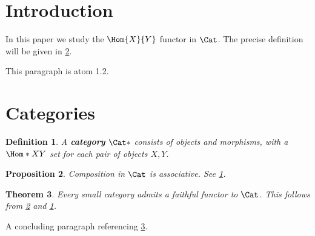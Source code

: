 \documentclass{article}
\newtheorem{theorem}{Theorem}[section]
\newtheorem{definition}[theorem]{Definition}
\newtheorem{proposition}[theorem]{Proposition}
\begin{document}
\section{Introduction}

In this paper we study the $\Hom{X}{Y}$ functor in $\Cat$.
The precise definition will be given in \cref{sec:cats}.

This paragraph is atom 1.2.

\section{Categories}\label{sec:cats}

\begin{definition}\label{def:cat}
  A \textbf{category} $\Cat*$ consists of objects and morphisms,
  with a $\Hom*{X}{Y}$ set for each pair of objects $X, Y$.
\end{definition}

\begin{proposition}\label{prop:comp}
  Composition in $\Cat$ is associative. See \cref{def:cat}.
\end{proposition}

\begin{theorem}\label{thm:main}
  Every small category admits a faithful functor to $\Cat$.
  This follows from \cref{prop:comp} and \cref{def:cat}.
\end{theorem}

A concluding paragraph referencing \cref{thm:main}.
\end{document}
